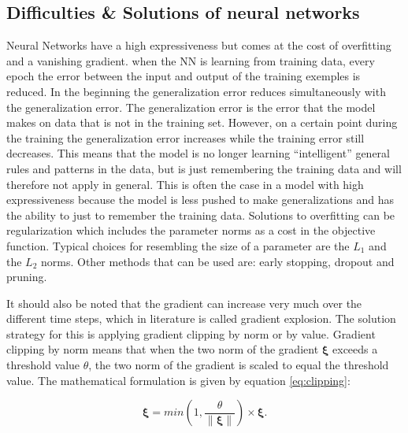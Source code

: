 \subsection{Difficulties \& Solutions of neural networks}\label{s:Problems}
Neural Networks have a high expressiveness but comes at the cost of overfitting and a vanishing gradient.
when the NN is learning from training data, every epoch the error between the input and output of the training exemples is reduced. In the beginning the generalization error reduces simultaneously with the generalization error. The generalization error is the error that the model makes on data that is not in the training set. However, on a certain point during the training the generalization error increases while the training error still decreases. This means that the model is no longer learning ``intelligent'' general rules and patterns in the data, but is just remembering the training data and will therefore not apply in general. This is often the case in a model with high expressiveness because the model is less pushed to make generalizations and has the ability to just to remember the training data. Solutions to overfitting can be regularization which includes the parameter norms as a cost in the objective function. Typical choices for resembling the size of a parameter are the $ L_1 $ and the $ L_2 $ norms. Other methods that can be used are: early stopping, dropout and pruning.

It should also be noted that the gradient can increase very much over the different time steps, which in literature is called gradient explosion. The solution strategy for this is applying gradient clipping by norm or by value. Gradient clipping by norm means that when the two norm of the gradient $ \bm{\xi} $ exceeds a threshold value $ \theta $, the two norm of the gradient is scaled to equal the threshold value. The mathematical formulation is given by equation \ref{eq:clipping}:

\begin{equation}\label{eq:clipping}
	\bm{\xi}= min(1,\frac{\theta}{\| \bm{\xi} \|})\times\bm{\xi}.
\end{equation}

